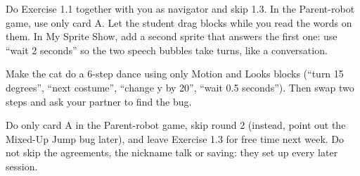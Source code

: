\begin{differentiation}
\supportpath Do Exercise 1.1 together with you as navigator and skip 1.3. In the Parent-robot game, use only card A. Let the student drag blocks while you read the words on them.
\extensionpath In My Sprite Show, add a second sprite that answers the first one: use \enquote{wait 2 seconds} so the two speech bubbles take turns, like a conversation.
\end{differentiation}

\begin{stretchchallenge}
Make the cat do a 6-step dance using only Motion and Looks blocks (\enquote{turn 15 degrees}, \enquote{next costume}, \enquote{change y by 20}, \enquote{wait 0.5 seconds}). Then swap two steps and ask your partner to find the bug.
\end{stretchchallenge}

\begin{teachernote}
Do only card A in the Parent-robot game, skip round 2 (instead, point out the Mixed-Up Jump bug later), and leave Exercise 1.3 for free time next week. Do not skip the agreements, the nickname talk or saving: they set up every later session.
\end{teachernote}
